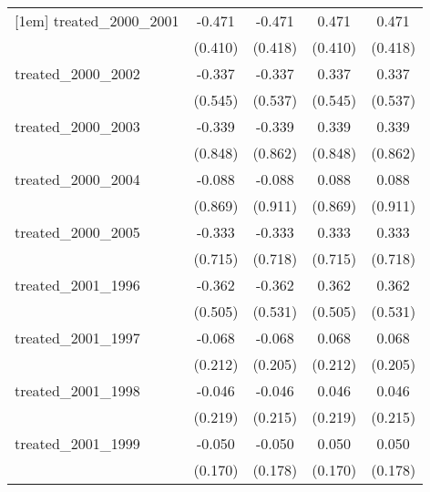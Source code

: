 {\begin{tabular}{l*{4}{c}}
[1em]
treated\_2000\_2001&      -0.471         &      -0.471         &       0.471         &       0.471         \\
            &     (0.410)         &     (0.418)         &     (0.410)         &     (0.418)         \\
[1em]
treated\_2000\_2002&      -0.337         &      -0.337         &       0.337         &       0.337         \\
            &     (0.545)         &     (0.537)         &     (0.545)         &     (0.537)         \\
[1em]
treated\_2000\_2003&      -0.339         &      -0.339         &       0.339         &       0.339         \\
            &     (0.848)         &     (0.862)         &     (0.848)         &     (0.862)         \\
[1em]
treated\_2000\_2004&      -0.088         &      -0.088         &       0.088         &       0.088         \\
            &     (0.869)         &     (0.911)         &     (0.869)         &     (0.911)         \\
[1em]
treated\_2000\_2005&      -0.333         &      -0.333         &       0.333         &       0.333         \\
            &     (0.715)         &     (0.718)         &     (0.715)         &     (0.718)         \\
[1em]
treated\_2001\_1996&      -0.362         &      -0.362         &       0.362         &       0.362         \\
            &     (0.505)         &     (0.531)         &     (0.505)         &     (0.531)         \\
[1em]
treated\_2001\_1997&      -0.068         &      -0.068         &       0.068         &       0.068         \\
            &     (0.212)         &     (0.205)         &     (0.212)         &     (0.205)         \\
[1em]
treated\_2001\_1998&      -0.046         &      -0.046         &       0.046         &       0.046         \\
            &     (0.219)         &     (0.215)         &     (0.219)         &     (0.215)         \\
[1em]
treated\_2001\_1999&      -0.050         &      -0.050         &       0.050         &       0.050         \\
            &     (0.170)         &     (0.178)         &     (0.170)         &     (0.178)         \\

\end{tabular}}
